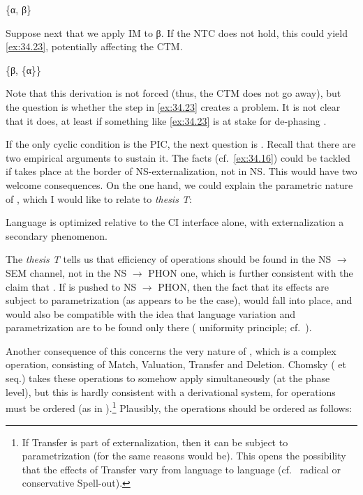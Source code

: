 \documentclass[output=paper]{langsci/langscibook}
\begin{document}
\ea%
    \label{ex:34.22}
    \{α, β\}
\z

Suppose next that we apply \gls{IM} to β. If the \gls{NTC} does not hold, this could yield \eqref{ex:34.23}, potentially
affecting the \gls{CTM}.

\ea%
    \label{ex:34.23}
    \{β, \{α\}\}
\z

Note that this derivation is not forced (thus, the \gls{CTM} does not go away),
but the question is whether the step in \eqref{ex:34.23} creates a problem. It is not clear
that it does, at least if something like \eqref{ex:34.23} is at stake for de-phasing
\parencite[cf.][]{Chomsky2015}.

If the only cyclic condition is the \gls{PIC}, the next question is
.  Recall that there are two empirical arguments to sustain it.
The  facts (cf.~\ref{ex:34.16}) could be tackled if 
takes place at the border of \gls{NS}-externalization, not in \gls{NS}. This
would have two welcome consequences. On the one hand, we could explain the
parametric nature of , which I would like to relate to
 \emph{thesis T}:

\ea%
    \label{ex:34.24}
    Language is optimized relative to the \gls{CI} interface alone, with
    externalization a secondary phenomenon. \parencite[7]{Chomsky2014}
\z

The \emph{thesis T} tells us that efficiency of operations should be found in
the \gls{NS} $\rightarrow$ SEM channel, not in the \gls{NS} $\rightarrow$ PHON
one, which is further consistent with the claim that
. If  is pushed to NS ${\rightarrow}$
PHON, then the fact that its effects are subject to parametrization (as appears
to be the case), would fall into place, and would also be compatible with the
idea that language variation and parametrization are to be found only there
( uniformity principle; cf.~\citealt{Chomsky2010,BerCho2011}).

Another consequence of this concerns the very nature of , which is a
complex operation, consisting of Match, Valuation, Transfer and Deletion.
Chomsky (\citeyear{Chomsky2004} et seq.) takes these operations to somehow apply simultaneously
(at the phase level), but this is hardly consistent with a derivational system,
for operations must be ordered (as in \citealt{Chomsky2015}).\footnote{If
    Transfer is part of externalization, then it can be subject to
    parametrization (for the same reasons  would be). This opens the
possibility that the effects of Transfer vary from language to language
(cf.~ radical or conservative Spell-out).}
Plausibly, the operations should be ordered as follows:
\end{document}
